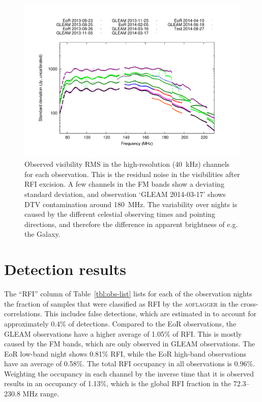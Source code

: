 \documentclass{pasa}
\begin{document}
\noindent\begin{figure}
\begin{center}\hspace*{-0.2cm}\includegraphics[width=18cm]{img/plot-stddev-per-set}\vspace{-1cm}
\caption{Observed visibility RMS in the high-resolution (40~kHz) channels for each observation. This is the residual noise in the visibilities after RFI excision. A few channels in the FM bands show a deviating standard deviation, and observation `GLEAM 2014-03-17' shows DTV contamination around 180~MHz. The variability over nights is caused by the different celestial observing times and pointing directions, and therefore the difference in apparent brightness of e.g. the Galaxy.}
\label{fig:stddev-per-set}
\end{center}
\end{figure}

\section{Detection results} \label{ch:detection-results}
The ``RFI'' column of Table~\ref{tbl:obs-list} lists for each of the observation nights the fraction of samples that were classified as RFI by the \textsc{aoflagger} in the cross-correlations. This includes false detections, which are estimated in \citet{lofar-radio-environment} to account for approximately 0.4\% of detections. Compared to the EoR observations, the GLEAM observations have a higher average of 1.05\% of RFI. This is mostly caused by the FM bands, which are only observed in GLEAM observations. The EoR low-band night shows 0.81\% RFI, while the EoR high-band observations have an average of 0.58\%. The total RFI occupancy in all observations is 0.96\%. Weighting the occupancy in each channel by the inverse time that it is observed results in an occupancy of 1.13\%, which is the global RFI fraction in the 72.3--230.8 MHz range.
\end{document}
